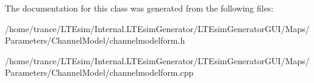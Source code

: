 The documentation for this class was generated from the following files\+:\begin{DoxyCompactItemize}
\item 
/home/trance/\+L\+T\+Esim/\+Internal.\+L\+T\+Esim\+Generator/\+L\+T\+Esim\+Generator\+G\+U\+I/\+Maps/\+Parameters/\+Channel\+Model/channelmodelform.\+h\item 
/home/trance/\+L\+T\+Esim/\+Internal.\+L\+T\+Esim\+Generator/\+L\+T\+Esim\+Generator\+G\+U\+I/\+Maps/\+Parameters/\+Channel\+Model/channelmodelform.\+cpp\end{DoxyCompactItemize}

